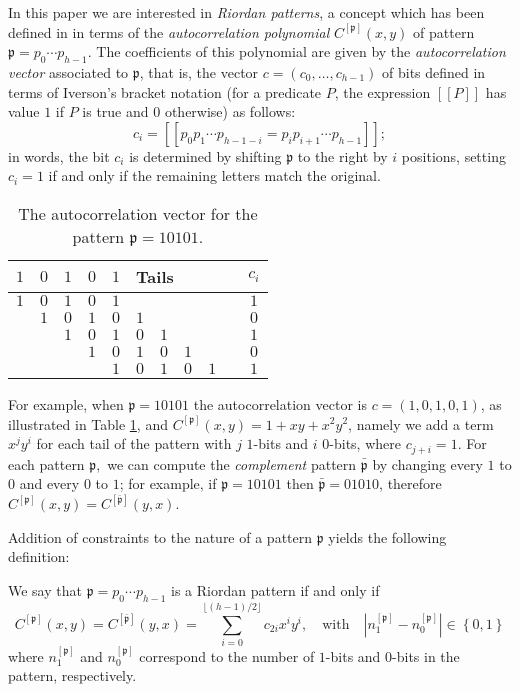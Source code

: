 In this paper we are interested in \textit{Riordan patterns}, a concept which
has been defined in \citep{MERLINI20112988} in terms of the \textit{autocorrelation
polynomial} $C^{[\mathfrak{p}]}(x,y)$ of pattern $\mathfrak{p}=p_{0}\cdots
p_{h-1}$. The coefficients of this polynomial are given by the
\textit{autocorrelation vector} associated to $\mathfrak{p}$, that is, the
vector $c=(c_0,\ldots ,c_{h-1})$ of bits defined in terms of Iverson's bracket
notation (for a predicate $P$, the expression $[\![P]\!]$ has value $1$ if $P$
is true and $0$ otherwise) as follows:
$$c_i=[\![p_0p_1\cdots p_{h-1-i}=p_{i}p_{i+1}\cdots p_{h-1}]\!];$$
in words, the bit $c_i$ is determined by shifting $\mathfrak{p}$ to the right by
$i$ positions, setting $c_i=1$ if and only if the remaining letters match the
original.
\begin{table}
    \begin{center}
        \begin{tabular}{ccccc|cccccc}
          $1$ & $0$ & $1$ & $0$& $1$ &   \multicolumn{5}{l}{Tails} & $c_{i}$  \\
          \hline
          $1$ & $0$ & $1$ & $0$ & $1$ & &   &   &   &    &    $1$ \\
            & $1$ & $0$ & $1$ & $0$ & $1$ &  &   &   &   &    $0$ \\
            &   & $1$ & $0$ & $1$ & $0$ & $1$ &  &   &   &    $1$ \\
            &   &   & $1$ & $0$ & $1$ & $0$ & $1$ &  &   &    $0$ \\
            &   &   &   & $1$ & $0$ & $1$ & $0$ & $1$ &  &    $1$ \\
        \end{tabular}
    \end{center}
\caption{\label{auto}The autocorrelation vector for the pattern $\mathfrak{p}= 10101$.}
\end{table}
For example, when $\mathfrak{p}= 10101$ the autocorrelation vector is
$c=(1,0,1,0,1)$, as illustrated in Table \ref{auto}, and
$C^{[\mathfrak{p}]}(x,y)=1+xy+x^2y^2$, namely we add a term $x^jy^i$ for each
tail of the pattern with $j$ $1$-bits  and $i$ $0$-bits, where $c_{j+i}=1$.
For each pattern $\mathfrak{p},$  we can compute the \textit{complement} pattern
$\mathfrak{\bar{p}}$  by changing every $1$ to $0$ and every $0$ to $1$; for
example, if $\mathfrak{p}= 10101$ then $\mathfrak{\bar{p}}=01010$, therefore
$C^{[\mathfrak{p}]}(x,y)=C^{[\mathfrak{\bar{p}}]}(y,x)$.

Addition of constraints to the nature of a pattern $\mathfrak{p}$ yields
the following definition:
\begin{definition}
\label{defrp}
We say that $\mathfrak{p}=p_0\cdots p_{h-1}$ is a Riordan pattern if and only
if
\begin{displaymath}
C^{[\mathfrak{p}]}(x,y)=C^{[\mathfrak{\bar{p}}]}(y,x)=\sum_{i=0}^{\lfloor(h-1)/2\rfloor}c_{2i}x^iy^i,
\quad \mbox{with} \quad |n_1^{[\mathfrak{p}]}-n_0^{[\mathfrak{p}]}|\in
\left\{0,1 \right\}
\end{displaymath}
where $n_1^{[\mathfrak{p}]}$ and  $n_0^{[\mathfrak{p}]}$ correspond to the
number of $1$-bits  and $0$-bits  in the pattern, respectively.
\end{definition}

